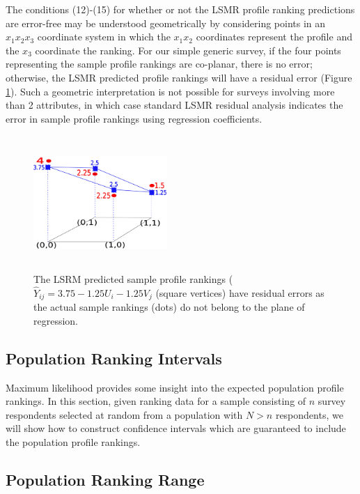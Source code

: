 \documentclass[a4paper, 12pt]{article}
\begin{document}
The conditions  (12)-(15) for whether or not the LSMR  profile ranking predictions are error-free may be understood geometrically by considering points in an $x_1x_2x_3$ coordinate system in which the $x_1x_2$ coordinates represent the profile and the $x_3$ coordinate the ranking. For our simple generic survey,  if the four points representing the sample profile rankings are co-planar, there is no error; otherwise, the LSMR predicted profile rankings will have a residual error (Figure  \ref{sec4fig}).  Such a geometric interpretation  is not possible for surveys involving more than 2 attributes, in which case standard LSMR residual analysis indicates the error in sample  profile rankings using regression coefficients.


\begin{figure}[!htpb]
	\centering
	\includegraphics[width=2in,height=2in]{sec4fig.png}
	\caption{{\small The LSRM predicted sample profile rankings ($\hat{Y}_{ij}=3.75-1.25U_i-1.25V_j$ (square vertices) have residual errors as the actual sample rankings (dots) do not belong to the plane of regression. }}	
	\label{sec4fig}
\end{figure}



\newpage

\subsection{Population Ranking Intervals}

Maximum likelihood  provides some insight into the expected population profile rankings. In this section, given ranking data for a sample consisting of $n$ survey respondents selected at random from a population with $N> n$ respondents, we will show how to construct confidence  intervals   which are guaranteed to include the population profile rankings.

\subsection{Population Ranking Range}
\end{document}
